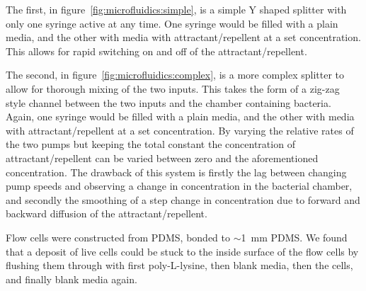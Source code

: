 \documentclass[../main.tex]{subfiles}
\begin{document}
The first, in figure~\ref{fig:microfluidics:simple}, is a simple Y shaped splitter with only one syringe active at any time. One syringe would be filled with a plain media, and the other with media with attractant/repellent at a set concentration. This allows for rapid switching on and off of the attractant/repellent.

The second, in figure~\ref{fig:microfluidics:complex}, is a more complex splitter to allow for thorough mixing of the two inputs. This takes the form of a zig-zag style channel between the two inputs and the chamber containing bacteria. Again, one syringe would be filled with a plain media, and the other with media with attractant/repellent at a set concentration. By varying the relative rates of the two pumps but keeping the total constant the concentration of attractant/repellent can be varied between zero and the aforementioned concentration. The drawback of this system is firstly the lag between changing pump speeds and observing a change in concentration in the bacterial chamber, and secondly the smoothing of a step change in concentration due to forward and backward diffusion of the attractant/repellent.

Flow cells were constructed from PDMS, bonded to \(\sim\)\SI{1}{\milli\meter} PDMS. We found that a deposit of live cells could be stuck to the inside surface of the flow cells by flushing them through with first poly-L-lysine, then blank media, then the cells, and finally blank media again.
\end{document}
